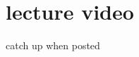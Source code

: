 \documentclass[a4paper]{article}
\begin{document}
\setcounter{section}{12} %
\section{lecture video}
catch up when posted
\end{document}

